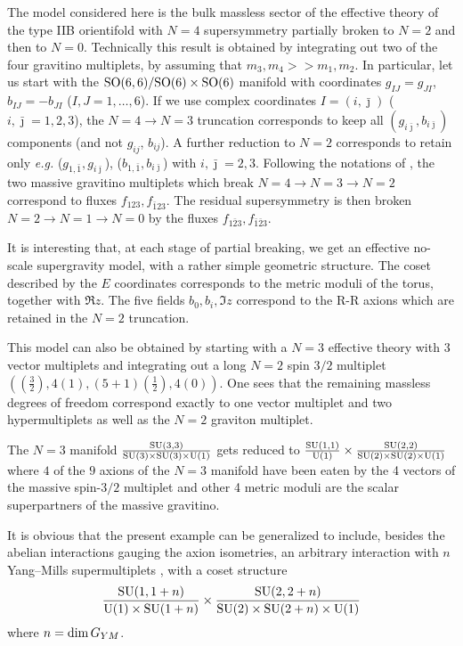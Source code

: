\documentclass[a4paper,12pt]{article}
\begin{document}
The model considered here is the bulk massless sector of the effective theory of the type IIB orientifold \cite{fp1,kst}
with $N=4$ supersymmetry partially broken to $N=2$ and then to $N=0$.
Technically this result is obtained by integrating out two of the four gravitino multiplets, 
by assuming that $m_3, m_4 >>m_1, m_2$.
In particular, let us start with the $\mathrm{SO}(6,6) / \mathrm{SO}(6)\times \mathrm{SO}(6)$ manifold with coordinates $g_{IJ}=g_{JI}$, 
$b_{IJ} = -b_{JI}$ ($I,J=1,\dots , 6$). If we use complex coordinates $I=(i,\bar\jmath )$ ($i,\bar\jmath=1,2,3$), the $N=4 \to N=3$
truncation corresponds to keep all $(g_{i\bar\jmath}, b_{i\bar\jmath})$ components (and not $g_{ij}$, $b_{ij}$).
A further reduction to $N=2$ corresponds to retain only {\em e.g.}
($g_{1,\bar 1}, g_{i\bar\jmath}$), ($b_{1,\bar 1}, b_{i\bar\jmath}$) with $i,\bar\jmath =2,3$.
Following the notations of \cite{dfv}, the two massive gravitino multiplets which break $N=4 \to N=3 \to N=2$
correspond to fluxes $f_{123}, f_{\bar 1 23}$. The residual supersymmetry is then broken $N=2 \to N=1 \to N=0$ by the 
fluxes $f_{1\bar 2 3}, f_{\bar 1 \bar 2 3}$.


It is interesting that, at each stage of partial breaking, we get an effective no-scale supergravity model,
with a rather simple geometric structure.
The coset described by the $E$ coordinates corresponds to the metric moduli of the torus, together with $\Re z$.
The five fields $b_0,b_i, \Im z$ correspond to the R-R axions which are retained in the $N=2$ truncation.

This model can also be obtained by starting with a $N=3$ effective theory with 3 vector multiplets \cite{fp1}
and integrating out a long $N=2$ spin $3/2$ multiplet $\left((\frac 32), 4(1), (5+1) (\frac 12), 4(0)\right)$.
One sees that the remaining massless degrees of freedom correspond exactly to one vector multiplet and two hypermultiplets 
as well as the $N=2$ graviton multiplet.

The $N=3$  manifold $\frac {\mathrm{SU}(3,3)}{\mathrm{SU}(3)\times \mathrm{SU}(3) \times \mathrm{U}(1)}$ gets reduced to 
$\frac {\mathrm{SU}(1,1)}{ \mathrm{U}(1)}\times \frac {\mathrm{SU}(2,2)}{\mathrm{SU}(2)\times \mathrm{SU}(2) \times \mathrm{U}(1)}$
where $4$ of the $9$ axions of the $N=3$ manifold have been eaten by the 4 vectors of the massive spin-$3/2$ multiplet
and other 4 metric moduli are the scalar superpartners of the massive gravitino.

It is obvious that the present example can be generalized to include, besides the abelian interactions 
gauging the axion isometries, an arbitrary interaction with $n$ Yang--Mills supermultiplets \cite{grana,fm}, 
with a coset structure \cite{fp2,dflv}
$$\frac {\mathrm{SU}(1,1+n)}{\mathrm{U}(1)\times \mathrm{SU}(1+n)}\times \frac {\mathrm{SU}(2,2+n)}{\mathrm{SU}(2)\times \mathrm{SU}(2+n) \times \mathrm{U}(1)}$$
where $n={\rm dim}\,G_{YM}$.
\end{document}
